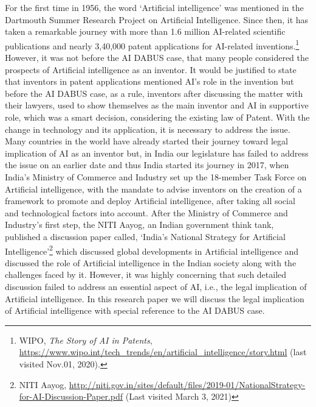 \setcounter{figure}{0}
\setcounter{table}{0}
\setcounter{footnote}{0}




\begin{multicols}{2}


\noi
For the first time in 1956, the word ‘Artificial intelligence’ was mentioned in the Dartmouth
Summer Research Project on Artificial Intelligence. Since then, it has taken a remarkable
journey with more than 1.6 million AI-related scientific publications and nearly 3,40,000
patent applications for AI-related inventions.\footnote{WIPO, \textit{The Story of AI in Patents}, \url{https://www.wipo.int/tech_trends/en/artificial_intelligence/story.html} (last
visited Nov.01, 2020).}
However, it was not before the AI DABUS
case, that many people considered the prospects of Artificial intelligence as an inventor. It
would be justified to state that inventors in patent applications mentioned AI’s role in the
invention but before the AI DABUS case, as a rule, inventors after discussing the matter
with their lawyers, used to show themselves as the main inventor and AI in supportive role,
which was a smart decision, considering the existing law of Patent. With the change in
technology and its application, it is necessary to address the issue. Many countries in the
world have already started their journey toward legal implication of AI as an inventor but, in
India our legislature has failed to address the issue on an earlier date and thus India started
its journey in 2017, when India’s Ministry of Commerce and Industry set up the 18-member
Task Force on Artificial intelligence, with the mandate to advise inventors on the creation of
a framework to promote and deploy Artificial intelligence, after taking all social and
technological factors into account. After the Ministry of Commerce and Industry’s first step,
the NITI Aayog, an Indian government think tank, published a discussion paper called,
‘India’s National Strategy for Artificial Intelligence’\footnote{NITI Aayog, \url{http://niti.gov.in/sites/default/files/2019-01/NationalStrategy-for-AI-Discussion-Paper.pdf} (Last
visited March 3, 2021)}
which discussed global developments
in Artificial intelligence and discussed the role of Artificial intelligence in the Indian society
along with the challenges faced by it. However, it was highly concerning that such detailed
discussion failed to address an essential aspect of AI, i.e., the legal implication of Artificial intelligence. In this research paper we will discuss the legal implication of Artificial
intelligence with special reference to the AI DABUS case.


\end{multicols}
